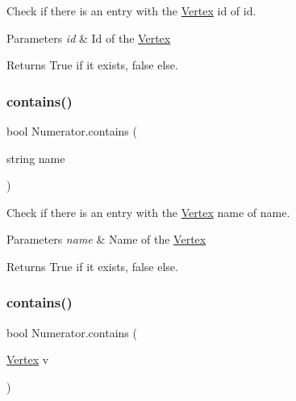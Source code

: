 Check if there is an entry with the \hyperlink{structVertex}{Vertex} id of id. 


\begin{DoxyParams}{Parameters}
{\em id} & Id of the \hyperlink{structVertex}{Vertex}\\
\hline
\end{DoxyParams}
\begin{DoxyReturn}{Returns}
True if it exists, false else.
\end{DoxyReturn}
\mbox{\label{classNumerator_ae3c1fcc2141cb29c89b0da1ffe2af9ea}} 
\subsubsection{\texorpdfstring{contains()}{contains()}\hspace{0.1cm}{\footnotesize\ttfamily [2/3]}}
{\footnotesize\ttfamily bool Numerator.\+contains (\begin{DoxyParamCaption}\item[{string}]{name }\end{DoxyParamCaption})\hspace{0.3cm}{\ttfamily [inline]}}



Check if there is an entry with the \hyperlink{structVertex}{Vertex} name of name. 


\begin{DoxyParams}{Parameters}
{\em name} & Name of the \hyperlink{structVertex}{Vertex}\\
\hline
\end{DoxyParams}
\begin{DoxyReturn}{Returns}
True if it exists, false else.
\end{DoxyReturn}
\mbox{\label{classNumerator_acd284ff3d7b2b03a1ef77af440e8221b}} 
\subsubsection{\texorpdfstring{contains()}{contains()}\hspace{0.1cm}{\footnotesize\ttfamily [3/3]}}
{\footnotesize\ttfamily bool Numerator.\+contains (\begin{DoxyParamCaption}\item[{\hyperlink{structVertex}{Vertex}}]{v }\end{DoxyParamCaption})\hspace{0.3cm}{\ttfamily [inline]}}



